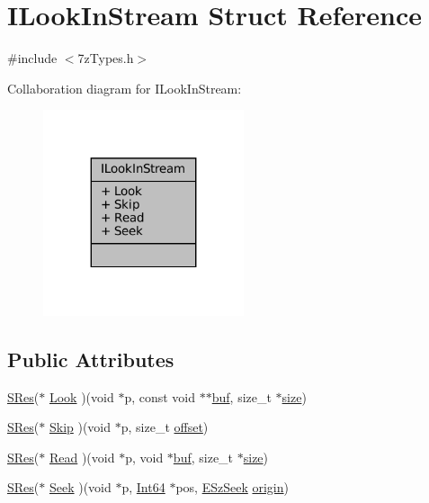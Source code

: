 \hypertarget{struct_i_look_in_stream}{}\section{I\+Look\+In\+Stream Struct Reference}
\label{struct_i_look_in_stream}


{\ttfamily \#include $<$7z\+Types.\+h$>$}



Collaboration diagram for I\+Look\+In\+Stream\+:
\nopagebreak
\begin{figure}[H]
\begin{center}
\leavevmode
\includegraphics[width=167pt]{struct_i_look_in_stream__coll__graph}
\end{center}
\end{figure}
\subsection*{Public Attributes}
\begin{DoxyCompactItemize}
\item 
\mbox{\hyperlink{7z_types_8h_acc0053eeb62726b68b22e8c7d9e91367}{S\+Res}}($\ast$ \mbox{\hyperlink{struct_i_look_in_stream_af4fdaf14775170775b985d378e5cd3b8}{Look}} )(void $\ast$p, const void $\ast$$\ast$\mbox{\hyperlink{ioapi_8h_a8ad8a13c88886b9f623034ff88570adb}{buf}}, size\+\_\+t $\ast$\mbox{\hyperlink{ioapi_8h_a014d89bd76f74ef3a29c8f04b473eb76}{size}})
\item 
\mbox{\hyperlink{7z_types_8h_acc0053eeb62726b68b22e8c7d9e91367}{S\+Res}}($\ast$ \mbox{\hyperlink{struct_i_look_in_stream_aca2f1b4749efd35470c67654e05f4ede}{Skip}} )(void $\ast$p, size\+\_\+t \mbox{\hyperlink{ioapi_8h_a601c4660e8a1a14a1b87fe387e934d19}{offset}})
\item 
\mbox{\hyperlink{7z_types_8h_acc0053eeb62726b68b22e8c7d9e91367}{S\+Res}}($\ast$ \mbox{\hyperlink{struct_i_look_in_stream_a2909f4ae4bd1c192e364591947e105e5}{Read}} )(void $\ast$p, void $\ast$\mbox{\hyperlink{ioapi_8h_a8ad8a13c88886b9f623034ff88570adb}{buf}}, size\+\_\+t $\ast$\mbox{\hyperlink{ioapi_8h_a014d89bd76f74ef3a29c8f04b473eb76}{size}})
\item 
\mbox{\hyperlink{7z_types_8h_acc0053eeb62726b68b22e8c7d9e91367}{S\+Res}}($\ast$ \mbox{\hyperlink{struct_i_look_in_stream_a26abc2d40e2fbb8ac0864681c53a6e9d}{Seek}} )(void $\ast$p, \mbox{\hyperlink{7z_types_8h_ade5ca5eec203b16d15253b7c422808bf}{Int64}} $\ast$pos, \mbox{\hyperlink{7z_types_8h_ab0216441b8737c13f5b275408f9e9709}{E\+Sz\+Seek}} \mbox{\hyperlink{ioapi_8h_a5f189a59b66f135978bce54f9d0fcade}{origin}})
\end{DoxyCompactItemize}


